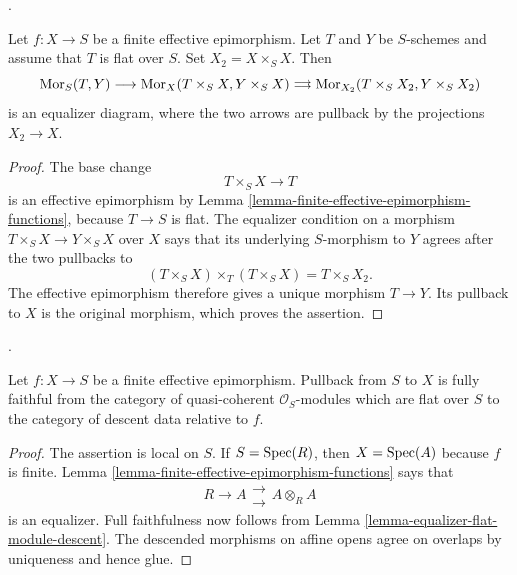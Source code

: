 \begin{lemma}
\label{lemma-finite-effective-epimorphism-flat-schemes}
\begin{reference}
\cite[Expos\'e 190, n\textsuperscript{o} 2(c), pp. 306--307]{FGA}.
\end{reference}
Let $f : X \to S$ be a finite effective epimorphism. Let $T$ and $Y$ be
$S$-schemes and assume that $T$ is flat over $S$. Set
$X_2 = X \times_S X$. Then
$$
\mathop{\mathrm{Mor}}\nolimits_S(T, Y) \longrightarrow
\mathop{\mathrm{Mor}}\nolimits_X(T \times_S X, Y \times_S X)
\mathrel{\substack{\longrightarrow \\[-0.6ex] \longrightarrow}}
\mathop{\mathrm{Mor}}\nolimits_{X_2}(T \times_S X_2, Y \times_S X_2)
$$
is an equalizer diagram, where the two arrows are pullback by the projections
$X_2 \to X$.
\end{lemma}

\begin{proof}
The base change
$$
T \times_S X \longrightarrow T
$$
is an effective epimorphism by Lemma
\ref{lemma-finite-effective-epimorphism-functions}, because $T \to S$ is
flat. The equalizer condition on a morphism
$T \times_S X \to Y \times_S X$ over $X$ says that its underlying
$S$-morphism to $Y$ agrees after the two pullbacks to
$$
(T \times_S X) \times_T (T \times_S X) = T \times_S X_2.
$$
The effective epimorphism therefore gives a unique morphism $T \to Y$.
Its pullback to $X$ is the original morphism, which proves the assertion.
\end{proof}

\begin{lemma}
\label{lemma-finite-effective-epimorphism-flat-quasi-coherent}
\begin{reference}
\cite[Expos\'e 190, n\textsuperscript{o} 2(c), pp. 306--307]{FGA}.
\end{reference}
Let $f : X \to S$ be a finite effective epimorphism. Pullback from $S$ to
$X$ is fully faithful from the category of quasi-coherent
$\mathcal{O}_S$-modules which are flat over $S$ to the category of descent
data relative to $f$.
\end{lemma}

\begin{proof}
The assertion is local on $S$. If $S = \mathop{\mathrm{Spec}}(R)$, then
$X = \mathop{\mathrm{Spec}}(A)$ because $f$ is finite. Lemma
\ref{lemma-finite-effective-epimorphism-functions} says that
$$
R \longrightarrow A
\mathrel{\substack{\longrightarrow \\[-0.6ex] \longrightarrow}}
A \otimes_R A
$$
is an equalizer. Full faithfulness now follows from Lemma
\ref{lemma-equalizer-flat-module-descent}. The descended morphisms on affine
opens agree on overlaps by uniqueness and hence glue.
\end{proof}

